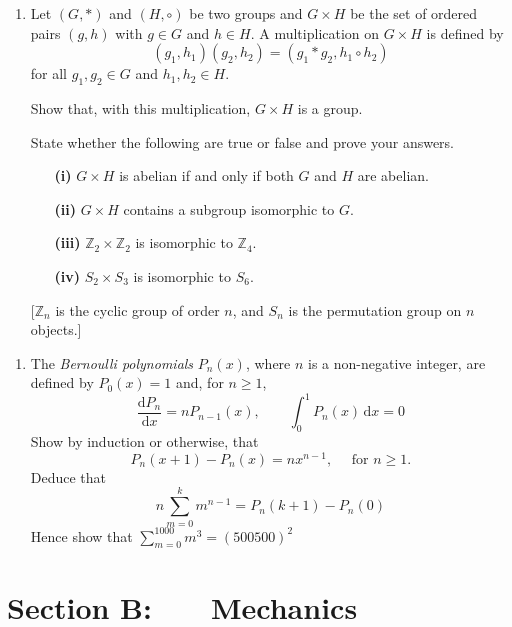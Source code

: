 \documentclass[a4, 11pt]{report}
\newlength{\qspace}
\newcounter{qnumber}
\newenvironment{question}%
 {\vspace{\qspace}
  \begin{enumerate}[\bfseries 1\quad][10]%
    \setcounter{enumi}{\value{qnumber}}%
    \item%
 }
{
  \end{enumerate}
  \filbreak
  \stepcounter{qnumber}
 }
\begin{document}
		
		\begin{question}
Let $(G,*)$ and $(H,\circ)$ be two groups and $G\times H$ be the
set of ordered pairs $(g,h)$ with $g\in G$ and $h\in H.$ A multiplication
on $G\times H$ is defined by 
\[
(g_{1},h_{1})(g_{2},h_{2})=(g_{1}*g_{2},h_{1}\circ h_{2})
\]
for all $g_{1},g_{2}\in G$ and $h_{1},h_{2}\in H$. 


Show that, with this multiplication, $G\times H$ is a group. 


State whether the following are true or false and prove your answers. 
\begin{enumerate}
\item[\bf (i)] $G\times H$ is abelian if and only if both $G$ and $H$ are abelian. 
\item[\bf (ii)] $G\times H$ contains a subgroup isomorphic to $G$. 
\item[\bf (iii)] $\mathbb{Z}_{2}\times\mathbb{Z}_{2}$ is isomorphic to $\mathbb{Z}_{4}.$
\item[\bf (iv)] $S_{2}\times S_{3}$ is isomorphic to $S_{6}.$
\end{enumerate}

{[}$\mathbb{Z}_{n}$ is the cyclic group of order $n$, and $S_{n}$
is the permutation group on $n$ objects.{]} 
		\end{question}
		
	
\begin{question}
The \textit{Bernoulli polynomials} $P_{n}(x)$, where $n$ is a non-negative
integer, are defined by $P_{0}(x)=1$ and, for $n\geqslant1$, 
\[
\frac{\mathrm{d}P_{n}}{\mathrm{d}x}=nP_{n-1}(x),\qquad\int_{0}^{1}P_{n}(x)\,\mathrm{d}x=0
\]
Show by induction or otherwise, that 
\[
P_{n}(x+1)-P_{n}(x)=nx^{n-1},\quad\mbox{ for }n\geqslant1.
\]
Deduce that
\[
n\sum_{m=0}^{k}m^{n-1}=P_{n}(k+1)-P_{n}(0)
\]
Hence show that ${\displaystyle \sum_{m=0}^{1000}m^{3}=(500500)^{2}}$
			\end{question}
			
		
		
		
	
\newpage
\section*{Section B: \ \ \ Mechanics}
\end{document}
